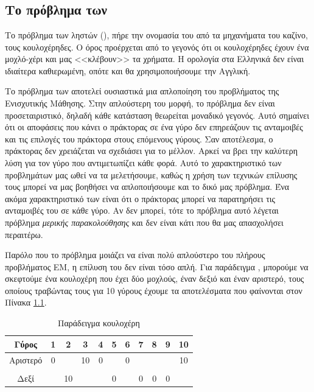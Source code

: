 \chapter{}
\label{chap:bandits}
\section{Το πρόβλημα των }

Το πρόβλημα των ληστών (), πήρε την ονομασία του από τα μηχανήματα του καζίνο, τους κουλοχέρηδες.
Ο όρος  προέρχεται από το γεγονός ότι οι κουλοχέρηδες έχουν ένα μοχλό-χέρι και μας <<κλέβουν>>
τα χρήματα. Η ορολογία στα Ελληνικά δεν είναι ιδιαίτερα καθιερωμένη, οπότε και θα χρησιμοποιήσουμε την Αγγλική.

Το πρόβλημα των  αποτελεί ουσιαστικά μια απλοποίηση του προβλήματος της Ενισχυτικής Μάθησης.
Στην απλούστερη του μορφή, το πρόβλημα δεν είναι προσεταιριστικό, δηλαδή κάθε κατάσταση θεωρείται μοναδικό γεγονός.
Αυτό σημαίνει ότι οι αποφάσεις που κάνει ο πράκτορας σε ένα γύρο δεν επηρεάζουν τις ανταμοιβές και τις επιλογές του
πράκτορα στους επόμενους γύρους. Σαν αποτέλεσμα, ο πράκτορας δεν χρειάζεται να σχεδιάσει για το μέλλον. Αρκεί να βρει
την καλύτερη λύση για τον γύρο που αντιμετωπίζει κάθε φορά. Αυτό το χαρακτηριστικό των προβλημάτων  μας ωθεί να τα μελετήσουμε,
καθώς η χρήση των τεχνικών επίλυσης τους μπορεί να μας βοηθήσει να απλοποιήσουμε και το δικό μας πρόβλημα.
Ένα ακόμα χαρακτηριστικό των  είναι ότι ο πράκτορας μπορεί να παρατηρήσει τις ανταμοιβές του σε κάθε γύρο.
Αν δεν μπορεί, τότε το πρόβλημα αυτό λέγεται πρόβλημα \textit{μερικής παρακολούθησης} και δεν είναι κάτι που θα μας απασχολήσει περαιτέρω.

Παρόλο που το πρόβλημα μοιάζει να είναι πολύ απλούστερο του πλήρους προβλήματος ΕΜ, η επίλυση του δεν είναι τόσο απλή.
Για παράδειγμα \cite{lattimore2020bandit}, μπορούμε να σκεφτούμε ένα κουλοχέρη που έχει δύο μοχλούς, έναν δεξιό και έναν αριστερό,
τους οποίους τραβώντας τους για 10 γύρους έχουμε τα αποτελέσματα που φαίνονται στον Πίνακα \ref{tab:bandit_example}.

\begin{table}[ht]
    \centering
    \begin{tabularx}{\textwidth}{ccccccccccc}
        \hline
        Γύρος    & 1 & 2  & 3  & 4 & 5 & 6 & 7 & 8 & 9 & 10 \\
        \hline
        Αριστερό & 0 &    & 10 & 0 &   & 0 &   &   &   & 10 \\ \\
        Δεξί     &   & 10 &    &   & 0 &   & 0 & 0 & 0 &    \\
        \hline
    \end{tabularx}
    \caption{Παράδειγμα κουλοχέρη}
    \label{tab:bandit_example}
\end{table}

